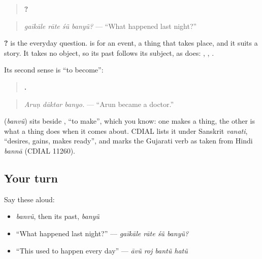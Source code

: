 \begin{quote}
\textbf{   ?}
\end{quote}

\begin{quote}
\emph{gaīkāle rāte śũ banyũ?} — \textquotedblleft{}What happened last night?\textquotedblright{}
\end{quote}

\textbf{ ?} is the everyday question. \textbf{} is for an event, a thing that takes place, and it suits a story. It takes no object, so its past follows its subject, as \textbf{} does: \textbf{}, \textbf{}, \textbf{}.

Its second sense is \textquotedblleft{}to become\textquotedblright{}:

\begin{quote}
\textbf{  .}
\end{quote}

\begin{quote}
\emph{Aruṇ dāktar banyo.} — \textquotedblleft{}Arun became a doctor.\textquotedblright{}
\end{quote}

\begin{cousinweb}
\textbf{} (\emph{banvũ}) sits beside \textbf{}, \textquotedblleft{}to make\textquotedblright{}, which you know: one makes a thing, the other is what a thing does when it comes about. CDIAL lists it under Sanskrit \emph{vanati}, \textquotedblleft{}desires, gains, makes ready\textquotedblright{}, and marks the Gujarati verb as taken from Hindi \emph{bannā} (CDIAL 11260).
\end{cousinweb}

\subsection*{Your turn}
Say these aloud:

\begin{itemize}
\raggedright
  \item \emph{banvũ}, then its past, \emph{banyũ}
  \item \textquotedblleft{}What happened last night?\textquotedblright{} — \emph{gaīkāle rāte śũ banyũ?}
  \item \textquotedblleft{}This used to happen every day\textquotedblright{} — \emph{āvũ roj bantũ hatũ}
\end{itemize}

